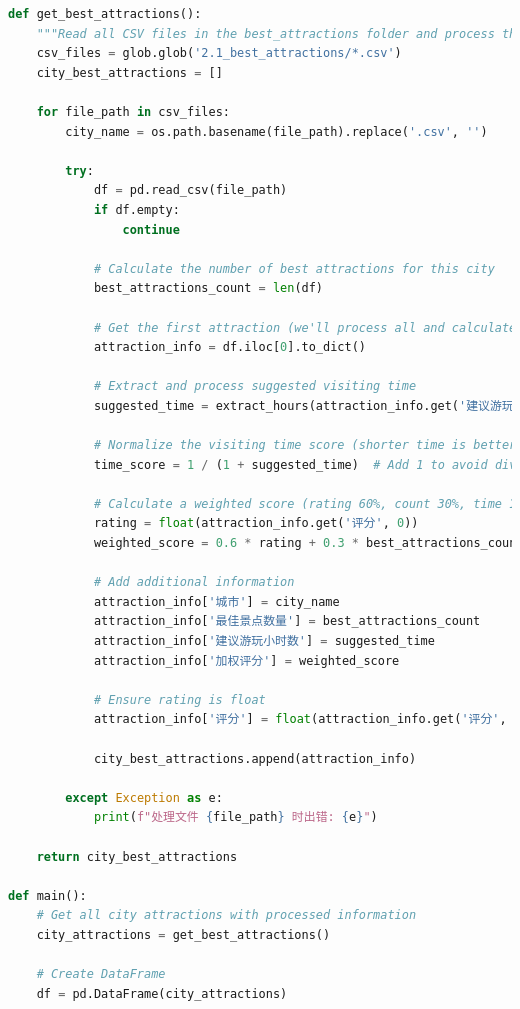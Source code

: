 \documentclass[withoutpreface,bwprint]{cumcmthesis} %
\begin{document}
\begin{appendices}
\begin{lstlisting}[language=python]
def get_best_attractions():
    """Read all CSV files in the best_attractions folder and process them"""
    csv_files = glob.glob('2.1_best_attractions/*.csv')
    city_best_attractions = []
    
    for file_path in csv_files:
        city_name = os.path.basename(file_path).replace('.csv', '')
        
        try:
            df = pd.read_csv(file_path)
            if df.empty:
                continue
            
            # Calculate the number of best attractions for this city
            best_attractions_count = len(df)
            
            # Get the first attraction (we'll process all and calculate a weighted score)
            attraction_info = df.iloc[0].to_dict()
            
            # Extract and process suggested visiting time
            suggested_time = extract_hours(attraction_info.get('建议游玩时间', 24))
            
            # Normalize the visiting time score (shorter time is better)
            time_score = 1 / (1 + suggested_time)  # Add 1 to avoid division by zero
            
            # Calculate a weighted score (rating 60%, count 30%, time 10%)
            rating = float(attraction_info.get('评分', 0))
            weighted_score = 0.6 * rating + 0.3 * best_attractions_count + 0.1 * time_score * 10
            
            # Add additional information
            attraction_info['城市'] = city_name
            attraction_info['最佳景点数量'] = best_attractions_count
            attraction_info['建议游玩小时数'] = suggested_time
            attraction_info['加权评分'] = weighted_score
            
            # Ensure rating is float
            attraction_info['评分'] = float(attraction_info.get('评分', 0))
            
            city_best_attractions.append(attraction_info)
            
        except Exception as e:
            print(f"处理文件 {file_path} 时出错: {e}")
    
    return city_best_attractions

def main():
    # Get all city attractions with processed information
    city_attractions = get_best_attractions()
    
    # Create DataFrame
    df = pd.DataFrame(city_attractions)
    

\end{lstlisting}
\end{appendices}
\end{document}

